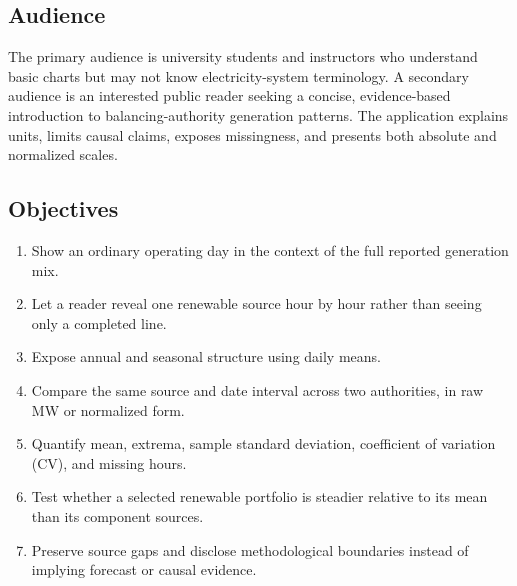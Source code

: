 \documentclass[11pt]{article}
\begin{document}
\subsection{Audience}
The primary audience is university students and instructors who understand basic charts but may not know electricity-system terminology. A secondary audience is an interested public reader seeking a concise, evidence-based introduction to balancing-authority generation patterns. The application explains units, limits causal claims, exposes missingness, and presents both absolute and normalized scales.

\subsection{Objectives}
\begin{enumerate}
  \item Show an ordinary operating day in the context of the full reported generation mix.
  \item Let a reader reveal one renewable source hour by hour rather than seeing only a completed line.
  \item Expose annual and seasonal structure using daily means.
  \item Compare the same source and date interval across two authorities, in raw MW or normalized form.
  \item Quantify mean, extrema, sample standard deviation, coefficient of variation (CV), and missing hours.
  \item Test whether a selected renewable portfolio is steadier relative to its mean than its component sources.
  \item Preserve source gaps and disclose methodological boundaries instead of implying forecast or causal evidence.
\end{enumerate}
\end{document}
